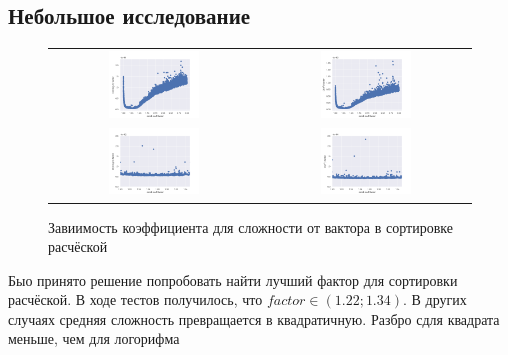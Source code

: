 \documentclass[12pt,a4paper]{article}
\begin{document}
\subsection{Небольшое исследование}
\begin{figure}[!ht]
\begin{tabular}{cc}
{\includegraphics[width=0.45\textwidth]{imgs/comb_logn_fc.png}} &
{\includegraphics[width=0.45\textwidth]{comb_n2_fc.png}} \\
{\includegraphics[width=0.45\textwidth]{imgs/comb_logn_fcsc.png}} &
{\includegraphics[width=0.45\textwidth]{comb_n2_fcsc.png}} 
\end{tabular}
\caption{Завиимость коэффициента для сложности от вактора в сортировке расчёской}
\end{figure}
Быо принято решение попробовать найти лучший фактор для сортировки расчёской. В ходе тестов получилось, что $factor \in (1.22; 1.34)$. В других случаях средняя сложность превращается в квадратичную. Разбро сдля квадрата меньше, чем для логорифма
\end{document}
